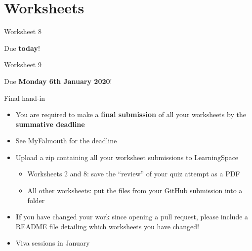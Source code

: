 \part{Worksheets}
\frame{\partpage}

\begin{frame}{Worksheet 8}
	\begin{center}
		Due \textbf{today}!
	\end{center}
\end{frame}

\begin{frame}{Worksheet 9}
	\begin{center}
		Due \textbf{Monday 6th January 2020}!
	\end{center}
\end{frame}

\begin{frame}{Final hand-in}
	\begin{itemize}
		\pause\item You are required to make a \textbf{final submission} of all your worksheets by the \textbf{summative deadline}
		\pause\item See MyFalmouth for the deadline
		\pause\item Upload a zip containing all your worksheet submissions to LearningSpace
			\begin{itemize}
				\pause\item Worksheets 2 and 8: save the ``review'' of your quiz attempt as a PDF
				\pause\item All other worksheets: put the files from your GitHub submission into a folder
			\end{itemize}
		\pause\item \textbf{If} you have changed your work since opening a pull request,
			please include a README file detailing which worksheets you have changed!
		\pause\item Viva sessions in January
	\end{itemize}
\end{frame}

